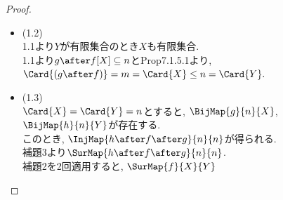 \begin{proof}
\begin{itemize}
    \begin{itemize}
     \item[]\hspace{-0.5cm} (有限集合のとき) \\
       $\BijMap{g}{Y}{n}$をみたす自然数$n$が存在するのでそんな$n$をひとつとり固定.\\
       また,
       $\InjMap {g \after f}{X}{n}$より,
       (7.1)を使うと$\BijMap {g \after f}{X}{(g\after f)[X]}$\\
       $h:= g \after f$とおく.\\
       このとき$h[X] \subseteq n$とCor7.1.6.1より,
       $\BijMap{r}{h[X]}{m}$をみたす自然数$m$が存在するので、そんな$m$を一つとり固定.\\
       このとき$\BijMap{r \after h}{X}{m}$が存在する.
       ゆえに$X$は有限集合である.
     \item[]\hspace{-0.5cm} (可算無限集合のとき) \\
       $\BijMap{g}{Y}{\nat}$をみたす$g$が存在する.\\
       また,
       $\InjMap{g \after f}{X}{\nat}$より,
       $h := g \after f$とおくと$\BijMap {h}{X}{h[X]}$.\\
       このとき,
       $h[X] \subseteq \nat$である.\\
       $h[X] \subseteq n$のときは有限集合のときに証明済.\\
       $h[X] \subseteq n$をみたす自然数$n$が存在しないとき,
       Prop7.1.5.2より$\BijMap{r}{h[X]}{\nat}$が存在する.\\
       このとき$\BijMap{s}{X}{\nat}$が存在する.
       ゆえに$X$は可算無限集合.
    \end{itemize}
    \item[]\hspace{-0.5cm} (1.2) \\
      1.1より$Y$が有限集合のとき$X$も有限集合.\\
      1.1より$g \after f[X] \subseteq n$とProp7.1.5.1より,
      $\Card{(g \after f)} = m = \Card{X} \leq n = \Card{Y}.$\\
    \item[]\hspace{-0.5cm} (1.3) \\
      $\Card{X} = \Card{Y} = n$とすると,
      $\BijMap{g}{n}{X}$,$\BijMap{h}{n}{Y}$が存在する.\\
      このとき,
      $\InjMap{h \after f \after g}{n}{n}$が得られる.\\
      補題3より$\SurMap{h \after f \after g}{n}{n}$.\\
      補題2を2回適用すると,
      $\SurMap{f}{X}{Y}$
  \end{itemize}
\end{proof}


